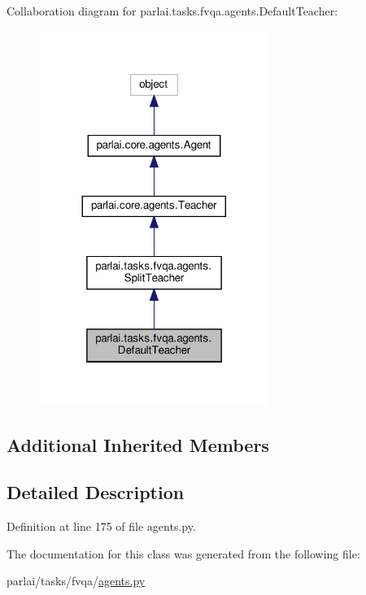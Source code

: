 Collaboration diagram for parlai.\+tasks.\+fvqa.\+agents.\+Default\+Teacher\+:\nopagebreak
\begin{figure}[H]
\begin{center}
\leavevmode
\includegraphics[width=212pt]{dd/dd1/classparlai_1_1tasks_1_1fvqa_1_1agents_1_1DefaultTeacher__coll__graph}
\end{center}
\end{figure}
\subsection*{Additional Inherited Members}


\subsection{Detailed Description}


Definition at line 175 of file agents.\+py.



The documentation for this class was generated from the following file\+:\begin{DoxyCompactItemize}
\item 
parlai/tasks/fvqa/\hyperlink{parlai_2tasks_2fvqa_2agents_8py}{agents.\+py}\end{DoxyCompactItemize}
